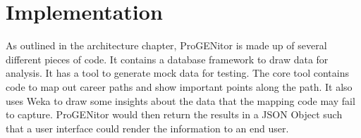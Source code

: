 \chapter{Implementation}
\label{chap:implementation}
As outlined in the architecture chapter, ProGENitor is made up of several
different pieces of code.  It contains a database framework to draw data for
analysis.  It has a tool to generate mock data for testing.  The core tool
contains code to map out career paths and show important points along the path. 
It also uses Weka to draw some insights about the data that the mapping code
may fail to capture.  ProGENitor would then return the results in a JSON Object
such that a user interface could render the information to an end user.







